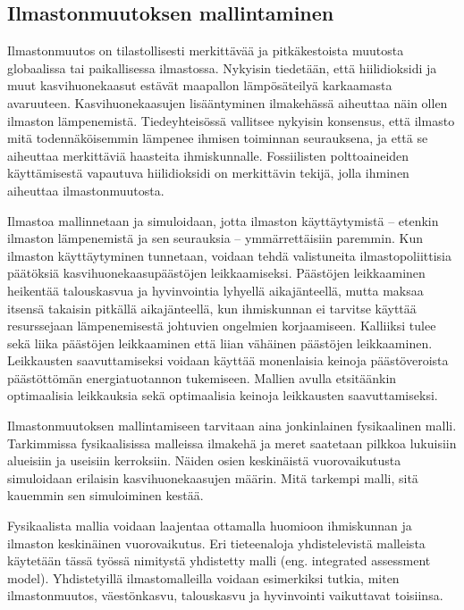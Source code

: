 \documentclass[finnish,12pt,a4paper,pdftex]{article}
\begin{document}
\begin{onehalfspacing}
\section{Ilmastonmuutoksen mallintaminen \label{ilmasto}}

Ilmastonmuutos on tilastollisesti merkittävää ja pitkäkestoista muutosta globaalissa tai paikallisessa ilmastossa. Nykyisin tiedetään, että hiilidioksidi ja muut kasvihuonekaasut estävät maapallon lämpösäteilyä karkaamasta avaruuteen. Kasvihuonekaasujen lisääntyminen ilmakehässä aiheuttaa näin ollen ilmaston lämpenemistä. Tiedeyhteisössä vallitsee nykyisin konsensus, että ilmasto mitä todennäköisemmin lämpenee ihmisen toiminnan seurauksena, ja että se aiheuttaa merkittäviä haasteita ihmiskunnalle. Fossiilisten polttoaineiden käyttämisestä vapautuva hiilidioksidi on merkittävin tekijä, jolla ihminen aiheuttaa ilmastonmuutosta. \cite{AmericanInstituteofPhysics} 

Ilmastoa mallinnetaan ja simuloidaan, jotta ilmaston käyttäytymistä -- etenkin ilmaston lämpenemistä ja sen seurauksia -- ymmärrettäisiin paremmin. Kun ilmaston käyttäytyminen tunnetaan, voidaan tehdä valistuneita ilmastopoliittisia päätöksiä kasvihuonekaasupäästöjen leikkaamiseksi. \cite{CroadsFlightSimulator2011} Päästöjen leikkaaminen heikentää talouskasvua ja hyvinvointia lyhyellä aikajänteellä, mutta maksaa itsensä takaisin pitkällä aikajänteellä, kun ihmiskunnan ei tarvitse käyttää resurssejaan lämpenemisestä johtuvien ongelmien korjaamiseen. Kalliiksi tulee sekä liika päästöjen leikkaaminen että liian vähäinen päästöjen leikkaaminen. Leikkausten saavuttamiseksi voidaan käyttää monenlaisia keinoja päästöveroista päästöttömän energiatuotannon tukemiseen. Mallien avulla etsitäänkin optimaalisia leikkauksia sekä optimaalisia keinoja leikkausten saavuttamiseksi. \cite{Fiddaman2002}

Ilmastonmuutoksen mallintamiseen tarvitaan aina jonkinlainen fysikaalinen malli. Tarkimmissa fysikaalisissa malleissa ilmakehä ja meret saatetaan pilkkoa lukuisiin alueisiin ja useisiin kerroksiin. Näiden osien keskinäistä vuorovaikutusta simuloidaan erilaisin kasvihuonekaasujen määrin. Mitä tarkempi malli, sitä kauemmin sen simuloiminen kestää. \cite{CroadsFlightSimulator2011} 

Fysikaalista mallia voidaan laajentaa ottamalla huomioon ihmiskunnan ja ilmaston keskinäinen vuorovaikutus. Eri tieteenaloja yhdistelevistä malleista käytetään tässä työssä nimitystä yhdistetty malli (eng. integrated assessment model). Yhdistetyillä ilmastomalleilla voidaan esimerkiksi tutkia, miten ilmastonmuutos, väestönkasvu, talouskasvu ja hyvinvointi vaikuttavat toisiinsa. \cite{U.S.DepartmentofEnergy2009} 


\end{onehalfspacing}
\end{document}
